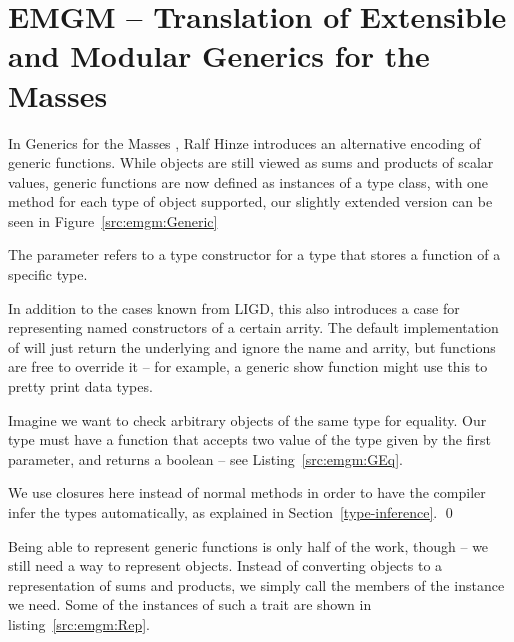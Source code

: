 \section{EMGM -- Translation of Extensible and Modular Generics for the Masses}


In Generics for the Masses \cite{GM}, Ralf Hinze introduces an alternative
encoding of generic functions. While objects are still viewed as sums and
products of scalar values, generic functions are now defined as instances
of a  type class, with one method for each type of object
supported, our slightly extended version can be seen in Figure~\ref{src:emgm:Generic}

The parameter  refers to a type constructor for a type that stores
a function of a specific type.

In addition to the cases known from LIGD, this also introduces a 
case for representing named constructors of a certain arrity. The default
implementation of  will just return the underlying  and
ignore the name and arrity, but functions are free to override it -- for example,
a generic show function might use this to pretty print data types.

\clearpage
\begin{example}
Imagine we want to check arbitrary objects of the same type for equality.
Our type  must have a function that accepts two
value of the type given by the first parameter, and returns a boolean
-- see Listing~\ref{src:emgm:GEq}.


We use closures here instead of normal methods in order to have the
compiler infer the types automatically, as explained in Section~\ref{type-inference}. \qed
\end{example}

Being able to represent generic functions is only half of the work, though
-- we still need a way to represent objects. Instead of converting objects
to a representation of sums and products, we simply call the members of
the  instance we need. Some of the instances of such a 
trait are shown in listing~\ref{src:emgm:Rep}.



